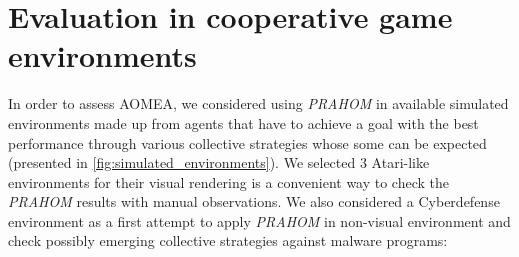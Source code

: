\documentclass[runningheads]{llncs}
\begin{document}
\section{Evaluation in cooperative game environments}



In order to assess AOMEA, we considered using \emph{PRAHOM} in available simulated environments made up from agents that have to achieve a goal with the best performance through various collective strategies whose some can be expected (presented in \autoref{fig:simulated_environments}).
We selected 3 Atari-like environments for their visual rendering is a convenient way to check the \emph{PRAHOM} results with manual observations\footnotemark[1].
We also considered a Cyberdefense environment as a first attempt to apply \emph{PRAHOM} in non-visual environment and check possibly emerging collective strategies against malware programs:

\end{document}
